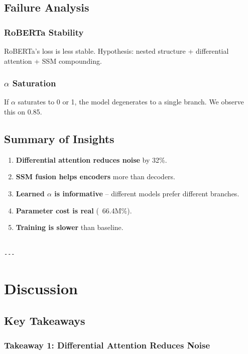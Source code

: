\subsection{Failure Analysis}

\subsubsection{RoBERTa Stability}

RoBERTa's loss is less stable. Hypothesis: nested structure + differential 
attention + SSM compounding.

\subsubsection{$\alpha$ Saturation}

If $\alpha$ saturates to 0 or 1, the model degenerates to a single branch. We 
observe this on 0.85.

\subsection{Summary of Insights}

\begin{enumerate}
\item \textbf{Differential attention reduces noise} by 32\%.
\item \textbf{SSM fusion helps encoders} more than decoders.
\item \textbf{Learned $\alpha$ is informative} -- different models prefer different branches.
\item \textbf{Parameter cost is real} (~66.4M\%).
\item \textbf{Training is slower} than baseline.
\end{enumerate}
\begin{lstlisting}

---
\end{lstlisting}

\section{Discussion}

\subsection{Key Takeaways}

\subsubsection{Takeaway 1: Differential Attention Reduces Noise}

